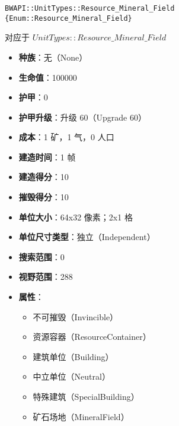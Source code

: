 \begin{tcolorbox}[colback=white, colframe=black!60!white, title=Resource\_Mineral\_Field(), arc=0mm]
    \begin{verbatim}
BWAPI::UnitTypes::Resource_Mineral_Field {Enum::Resource_Mineral_Field}
    \end{verbatim}
    对应于  $UnitTypes::Resource\_Mineral\_Field$ 
    \begin{itemize}
        \item \textbf{种族}：无（None）
        \item \textbf{生命值}：100000
        \item \textbf{护甲}：0
        \item \textbf{护甲升级}：升级 60（Upgrade 60）
        \item \textbf{成本}：1 矿，1 气，0 人口
        \item \textbf{建造时间}：1 帧
        \item \textbf{建造得分}：10
        \item \textbf{摧毁得分}：10
        \item \textbf{单位大小}：64x32 像素；2x1 格
        \item \textbf{单位尺寸类型}：独立（Independent）
        \item \textbf{搜索范围}：0
        \item \textbf{视野范围}：288
        \item \textbf{属性}：
            \begin{itemize}
                \item 不可摧毁（Invincible）
                \item 资源容器（ResourceContainer）
                \item 建筑单位（Building）
                \item 中立单位（Neutral）
                \item 特殊建筑（SpecialBuilding）
                \item 矿石场地（MineralField）
            \end{itemize}
    \end{itemize}
\end{tcolorbox}

